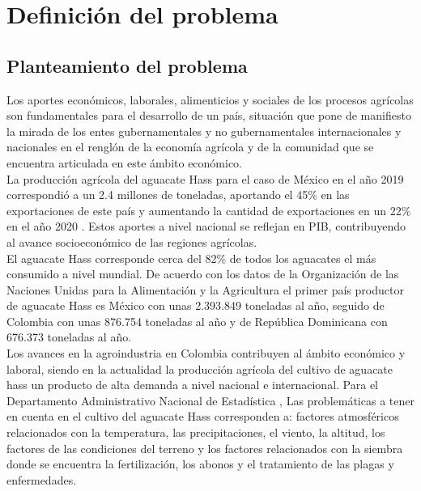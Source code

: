 \section{Definición del problema}
 

\subsection{Planteamiento del problema}
Los aportes económicos, laborales, alimenticios y sociales de los procesos agrícolas son fundamentales para el desarrollo de un país, situación que pone de manifiesto la mirada de los entes gubernamentales y no gubernamentales internacionales y nacionales en el renglón de la economía agrícola y de la comunidad que se encuentra articulada en este ámbito económico.\\ 

La producción agrícola del aguacate Hass para el caso de México en el año 2019 correspondió a un 2.4 millones de toneladas, aportando el 45\% en las exportaciones de este país y aumentando la cantidad de exportaciones en un 22\% en el año 2020 \citet{cruz2022competitividad}. Estos aportes a nivel nacional se reflejan en PIB, contribuyendo al avance socioeconómico de las regiones agrícolas.\\

El aguacate Hass corresponde cerca del 82\% de todos los aguacates el más consumido a nivel mundial. De acuerdo con los datos de la Organización de las Naciones Unidas para la Alimentación y la Agricultura \citet{faostat2021hacia} el primer país productor de aguacate Hass es México con unas 2.393.849 toneladas al año, seguido de Colombia con unas 876.754 toneladas al año y de República Dominicana con 676.373 toneladas al año.\\

Los avances en la agroindustria en Colombia contribuyen al ámbito económico y laboral, siendo en la actualidad la producción agrícola del cultivo de aguacate hass un producto de alta demanda a nivel nacional e internacional. Para el Departamento Administrativo Nacional de Estadística \citet{dane2016cultivo}, Las problemáticas a tener en cuenta en el cultivo del aguacate Hass corresponden a: factores atmosféricos relacionados con la temperatura, las precipitaciones, el viento, la altitud, los factores de las condiciones del terreno y los factores relacionados con la siembra donde se encuentra la fertilización, los abonos y el tratamiento de las plagas y enfermedades.\\

